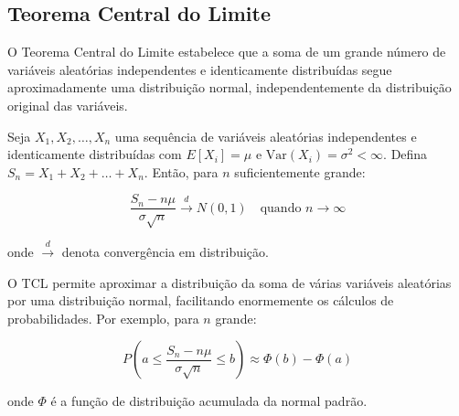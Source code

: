 \documentclass[a4paper,12pt]{article}
\begin{document}
\subsection{Teorema Central do Limite}

O Teorema Central do Limite estabelece que a soma de um grande número de variáveis aleatórias independentes e identicamente distribuídas segue aproximadamente uma distribuição normal, independentemente da distribuição original das variáveis.

Seja $X_1, X_2, \ldots, X_n$ uma sequência de variáveis aleatórias independentes e identicamente distribuídas com $E[X_i] = \mu$ e $\text{Var}(X_i) = \sigma^2 < \infty$. Defina $S_n = X_1 + X_2 + \ldots + X_n$. Então, para $n$ suficientemente grande:

\begin{equation}
\frac{S_n - n\mu}{\sigma\sqrt{n}} \xrightarrow{d} N(0, 1) \quad \text{quando } n \to \infty
\end{equation}

onde $\xrightarrow{d}$ denota convergência em distribuição.

\begin{tcolorbox}[colback=orange!5, colframe=orange!40, title=\textbf{Aplicação do Teorema Central do Limite}]
O TCL permite aproximar a distribuição da soma de várias variáveis aleatórias por uma distribuição normal, facilitando enormemente os cálculos de probabilidades. Por exemplo, para $n$ grande:

\begin{equation}
P\left(a \leq \frac{S_n - n\mu}{\sigma\sqrt{n}} \leq b\right) \approx \Phi(b) - \Phi(a)
\end{equation}

onde $\Phi$ é a função de distribuição acumulada da normal padrão.
\end{tcolorbox}
\end{document}
